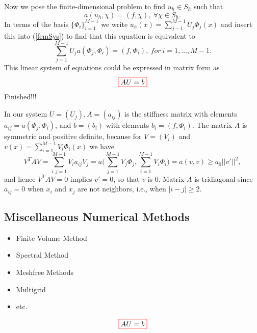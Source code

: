 \documentclass{beamer}
\begin{document}
\begin{frame}
Now we pose the finite-dimensional problem to find $u_h\in S_h$ such that
\begin{equation}
a(u_h,\chi)=(f,\chi),\ \forall \chi \in S_h.
\label{femSys}
\end{equation}
In terms of the basis $\{\Phi_i\}_{i=1}^{M-1}$ we write $u_h(x)=\sum_{j-1}^{M-1}U_j\Phi_j(x)$ and insert this into (\ref{femSys}) to find that this equation is equivalent to 
$$\sum^{M-1}_{j=1}U_ja(\Phi_j,\Phi_i)=(f,\Phi_i), \ for\ i=1,\ldots, M-1.$$
This linear system of equations could be expressed in matrix form as
$$\fcolorbox{red}{white}{\textcolor{black}{$AU=b$}} $$
Finished!!!
\end{frame}
\begin{frame}
In our system $U=(U_j), A=(a_{ij})$ is the stiffness matrix with elements $a_{ij}= a(\Phi_j,\Phi_i)$, and $ b = (b_i)$ with elements $ b_i = (f,\Phi_i)$. The matrix $A$ is symmetric and positive definite, because for $V = (V_i)$ and $v(x)=\sum_{i=1}^{M-1}V_i\Phi_i(x)$ we have
$$V^TAV=\sum_{i,j=1}^{M-1}V_ia_{ij}V_j=a\big(\sum_{j=1}^{M-1}V_j\Phi_j,\sum_{i=1}^{M-1}V_i\Phi_i)=a(v,v)\geq a_0||v'||^2,$$
and hence $V^TAV=0$ implies $v'=0$, so that $v$ is $0$. Matrix $A$ is tridiagonal since$a_{ij}=0$ when $x_i$ and $x_j$ are not neighbors, i.e., when $|i-j|\geq 2$.
\end{frame}
\subsection{Miscellaneous Numerical Methods}
\begin{frame}
\begin{itemize}
\frametitle{Miscellaneous Numerical Methods}
\item{Finite Volume Method}
\item{Spectral Method}
\item{Meshfree Methods}
\item{Multigrid}
\item{etc.}
\end{itemize}
$$\fcolorbox{red}{white}{\textcolor{black}{$AU=b$}} $$
\end{frame}

\begin{frame}


\end{frame}
\begin{frame}


\end{frame}
\begin{frame}


\end{frame}
\begin{frame}


\end{frame}
\end{document}
